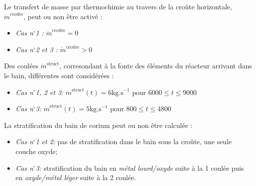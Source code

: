 \documentclass[3p]{elsarticle}
\begin{document}
Le transfert de masse par thermochimie au travers de la croûte horizontale, $\dot{m}^{\text{croûte}}$, peut ou non être activé :
\begin{itemize}
	\item \emph{Cas n$^{\circ}$1 :} $\dot{m}^{\text{croûte}} = 0$
	\item \emph{Cas n$^{\circ}$2 et 3 :} $\dot{m}^{\text{croûte}} > 0$
\end{itemize}

Des coulées $\dot{m}^{\text{struct}}$, corresondant à la fonte des éléments du réacteur arrivant dans le bain, différentes sont considérées : 
\begin{itemize}
	\item \emph{Cas n$^{\circ}$1, 2 et 3:} $\dot{m}^{\text{struct}}(t) = 6\text{kg.s}^{-1} \text{ pour } 6000\leq t\leq 9000$
	\item \emph{Cas n$^{\circ}$3:} $\dot{m}^{\text{struct}}(t) = 5\text{kg.s}^{-1} \text{ pour } 800\leq t\leq 4800$
\end{itemize}

La stratification du bain de corium peut ou non être calculée : 
\begin{itemize}
		\item \emph{Cas n$^{\circ}$1 et 2:} pas de stratification dans le bain sous la croûte, une seule couche oxyde;
		\item \emph{Cas n$^{\circ}$3:} stratification du bain en \emph{métal lourd/oxyde} suite à la 1\iere{} coulée puis en \emph{oxyde/métal léger} suite à la 2\ieme{} coulée.
\end{itemize}
\end{document}
